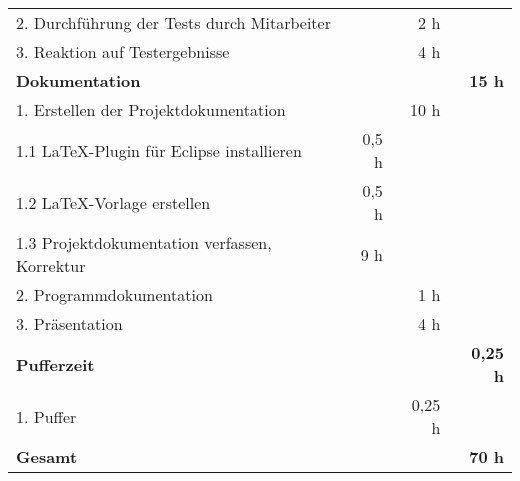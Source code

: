 \begin{tabularx}{\textwidth}{Xrrr}
\rowcolor{odd}2. Durchführung der Tests durch Mitarbeiter &       & 2 h   &  \\
3. Reaktion auf Testergebnisse &       & 4 h   &  \\
\rowcolor{heading}\textbf{Dokumentation} & \textbf{} & \textbf{} & \textbf{15 h} \\
1. Erstellen der Projektdokumentation &       & 10 h   &  \\
\rowcolor{odd}1.1 \LaTeX-Plugin für Eclipse installieren &   0,5 h    &    &  \\
1.2 \LaTeX-Vorlage erstellen &   0,5 h    &    &  \\
\rowcolor{odd}1.3 Projektdokumentation verfassen, Korrektur &   9 h    &  
&  \\
2. Programmdokumentation &       & 1 h   &  \\
\rowcolor{odd}3. Präsentation &       & 4 h   &  \\
\rowcolor{heading}\textbf{Pufferzeit} & \textbf{} & \textbf{} & \textbf{0,25 h}
\\
1. Puffer &       & 0,25 h   &  \\
\hline
\hline
\rowcolor{heading}\textbf{Gesamt} & \textbf{} & \textbf{} & \textbf{70 h} \\
\end{tabularx}
